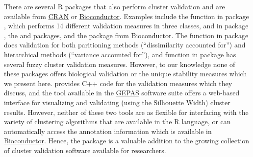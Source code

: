 \documentclass[11pt]{article}
\begin{document}
There are several R packages that also perform cluster validation and are available from
\href{http://www.r-project.org}{CRAN} or
\href{http://www.bioconductor.org}{Bioconductor}.   
Examples include the  function in package  \citep{cclust}, which performs 14
different validation measures in three classes,  %
 and  in package  \citep{fpc}, the
 \citep{clusterRepro} and 
\citep{clusterSim} packages, and the
 \citep{clusterStab} package from Bioconductor.  
The  function in package  \citep{clue} does validation
for both paritioning methods (``dissimilarity accounted for'') and
hierarchical methods (``variance accounted for''), and  %
function  in package  \citep{e1071} has several fuzzy
cluster validation measures.  
However, to our knowledge none of these packages offers biological validation or the
unique stability measures which we present here.  \citet{Han2005}
provides C++ code for the validation measures which they discuss, and
the  tool
available in the \href{http://gepas.bioinfo.cipf.es/}{GEPAS} software
suite offers a web-based interface for visualizing and validating
(using the Silhouette Width) cluster results.  However, neither of
these two tools are as flexible for interfacing with the variety of
clustering algorithms that are available in the R language, or can
automatically access the annotation information which is available in
\href{http://www.bioconductor.org/}{Bioconductor}. 
Hence, the  package is a valuable addition to the growing
collection of cluster validation software available for researchers.



{\small
  
  
}


%
%
\end{document}
